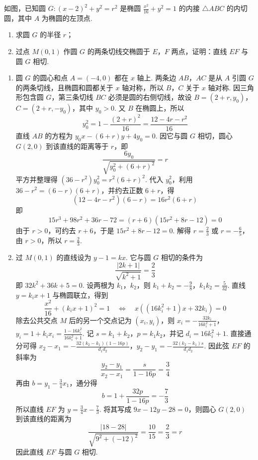\begin{problem}
如图，已知圆 \(G: (x - 2)^2 + y^2 = r^2\) 是椭圆 \(\frac{x^2}{16} + y^2 = 1\) 的内接 \(\triangle ABC\) 的内切圆，其中 \(A\) 为椭圆的左顶点.

\begin{enumerate}
\item 求圆 \(G\) 的半径 \(r\)；

\item 过点 \(M(0,1)\) 作圆 \(G\) 的两条切线交椭圆于 \(E\)，\(F\) 两点，证明：直线 \(EF\) 与圆 \(G\) 相切.
\end{enumerate}

\begin{solution}
\begin{enumerate}
\item
圆 \(G\) 的圆心和点 \(A=(-4,0)\) 都在 \(x\) 轴上. 两条边 \(AB\)，\(AC\) 是从 \(A\) 引圆 \(G\) 的两条切线，且椭圆和圆都关于 \(x\) 轴对称，所以 \(B\)，\(C\) 关于 \(x\) 轴对称. 因三角形包含圆 \(G\)，第三条切线 \(BC\) 必须是圆的右侧切线，故设 \(B=(2+r,y_0)\)，\(C=(2+r,-y_0)\)，其中 \(y_0>0\). 又 \(B\) 在椭圆上，所以
\[
y_0^{2}=1-\frac{(2+r)^{2}}{16}=\frac{12-4r-r^{2}}{16}
\]
直线 \(AB\) 的方程为 \(y_0x-(6+r)y+4y_0=0\). 因它与圆 \(G\) 相切，圆心 \(G(2,0)\) 到该直线的距离等于 \(r\)，即
\[
\frac{6y_0}{\sqrt{y_0^{2}+(6+r)^{2}}}=r
\]
平方并整理得 \((36-r^{2})y_0^{2}=r^{2}(6+r)^{2}\). 代入 \(y_0^{2}\)，利用 \(36-r^{2}=(6-r)(6+r)\)，并约去正数 \(6+r\)，得
\[
(12-4r-r^{2})(6-r)=16r^{2}(6+r)
\]
即
\[
15r^{3}+98r^{2}+36r-72=(r+6)(15r^{2}+8r-12)=0
\]
由于 \(r>0\)，可约去 \(r+6\)，于是 \(15r^{2}+8r-12=0\). 解得 \(r=\frac23\) 或 \(r=-\frac65\)，由 \(r>0\)，所以 \(r=\frac23\).

\item
过 \(M(0,1)\) 的直线设为 \(y-1=kx\). 它与圆 \(G\) 相切的条件为
\[
\frac{|2k+1|}{\sqrt{k^{2}+1}}=\frac23
\]
即 \(32k^{2}+36k+5=0\). 设两根为 \(k_1\)，\(k_2\)，则
\(k_1+k_2=-\frac98\)，\(k_1k_2=\frac5{32}\).
直线 \(y=k_ix+1\) 与椭圆联立，得到
\[
\frac{x^2}{16}+(k_ix+1)^2=1
\quad\Longleftrightarrow\quad
x\left((16k_i^2+1)x+32k_i\right)=0
\]
除去公共交点 \(M\) 后的另一个交点记为 \((x_i,y_i)\)，则
\(x_i=-\frac{32k_i}{16k_i^{2}+1}\)，\(y_i=1+k_ix_i=\frac{1-16k_i^2}{16k_i^2+1}\).
记 \(s=k_1+k_2\)，\(p=k_1k_2\)，并记 \(d_i=16k_i^2+1\). 直接通分可得
\(x_2-x_1=-\frac{32(k_2-k_1)(1-16p)}{d_1d_2}\)，\(y_2-y_1=-\frac{32(k_2-k_1)s}{d_1d_2}\).
因此弦 \(EF\) 的斜率为
\[
\frac{y_2-y_1}{x_2-x_1}=\frac{s}{1-16p}=\frac34
\]
再由 \(b=y_1-\frac34x_1\)，通分得
\[
b=1+\frac{32p}{1-16p}=-\frac73
\]
所以直线 \(EF\) 为 \(y=\frac34x-\frac73\). 将其写成 \(9x-12y-28=0\)，则圆心 \(G(2,0)\) 到该直线的距离为
\[
\frac{|18-28|}{\sqrt{9^{2}+(-12)^{2}}}=\frac{10}{15}=\frac23=r
\]
因此直线 \(EF\) 与圆 \(G\) 相切.
\end{enumerate}
\end{solution}
\end{problem}
